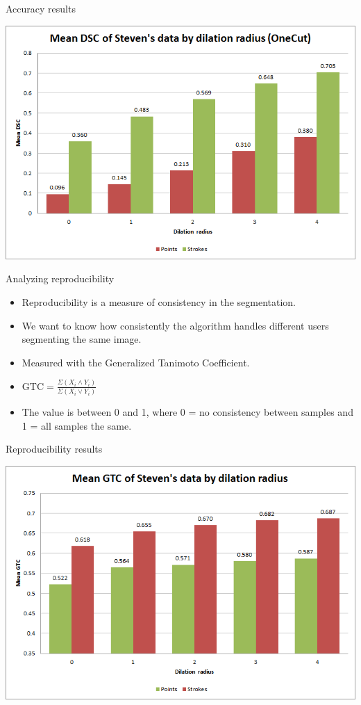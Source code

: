 \documentclass[14pt,xcolor=dvipsnames]{beamer}
\begin{document}
\begin{frame}[fragile,t]{Accuracy results}
	\begin{center}
		\includegraphics[width=\paperheight]{steven_onecut_dsc}
	\end{center}
\end{frame}

\begin{frame}[fragile,t]{Analyzing reproducibility}
	\begin{itemize}
		\item Reproducibility is a measure of consistency in the segmentation.
		\item We want to know how consistently the algorithm handles different users segmenting the same image.
		\item Measured with the Generalized Tanimoto Coefficient.
		\item $\text{GTC} = \frac{\Sigma \left( X_i \wedge Y_i \right)}{\Sigma \left( X_i \vee Y_i \right)}$
		\item The value is between 0 and 1, where 0 = no consistency between samples and 1 = all samples the same.
	\end{itemize}
\end{frame}

\begin{frame}[fragile,t]{Reproducibility results}
	\begin{center}
		\includegraphics[width=\paperheight]{steven_mean_gtc}
	\end{center}
\end{frame}
\end{document}
